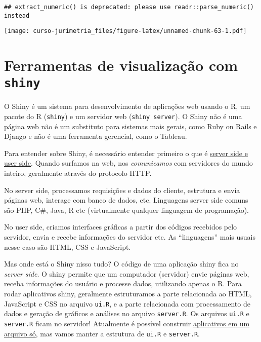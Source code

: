\documentclass[]{book}
\begin{document}
\begin{verbatim}
## extract_numeric() is deprecated: please use readr::parse_numeric() instead
\end{verbatim}

\texttt{[image: curso-jurimetria\_files/figure-latex/unnamed-chunk-63-1.pdf]}

\section{\texorpdfstring{Ferramentas de visualização com
\texttt{shiny}}{Ferramentas de visualização com shiny}}\label{ferramentas-de-visualizacao-com-shiny}

O Shiny é um sistema para desenvolvimento de aplicações web usando o R,
um pacote do R (\texttt{shiny}) e um servidor web
(\texttt{shiny\ server}). O Shiny não é uma página web não é um
substituto para sistemas mais gerais, como Ruby on Rails e Django e não
é uma ferramenta gerencial, como o Tableau.

Para entender sobre Shiny, é necessário entender primeiro o que é
\href{http://programmers.stackexchange.com/a/171210}{server side e user
side}. Quando surfamos na web, nos \emph{comunicamos} com servidores do
mundo inteiro, geralmente através do protocolo HTTP.

No server side, processamos requisições e dados do cliente, estrutura e
envia páginas web, interage com banco de dados, etc. Linguagens server
side comuns são PHP, C\#, Java, R etc (virtualmente qualquer linguagem
de programação).

No user side, criamos interfaces gráficas a partir dos códigos recebidos
pelo servidor, envia e recebe informações do servidor etc. As
``linguagens'' mais usuais nesse caso são HTML, CSS e JavaScript.

Mas onde está o Shiny nisso tudo? O código de uma aplicação shiny fica
no \emph{server side}. O shiny permite que um computador (servidor)
envie páginas web, receba informações do usuário e processe dados,
utilizando apenas o R. Para rodar aplicativos shiny, geralmente
estruturamos a parte relacionada ao HTML, JavaScript e CSS no arquivo
\texttt{ui.R}, e a parte relacionada com processamento de dados e
geração de gráficos e análises no arquivo \texttt{server.R}. Os arquivos
\texttt{ui.R} e \texttt{server.R} ficam no servidor! Atualmente é
possível construir
\href{http://shiny.rstudio.com/articles/single-file.html}{aplicativos em
um arquivo só}, mas vamos manter a estrutura de \texttt{ui.R} e
\texttt{server.R}.
\end{document}
